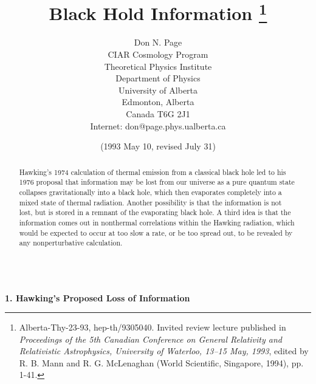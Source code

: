 \documentclass[12pt]{article}
\begin{document}
\title{Black Hold Information \thanks
{Alberta-Thy-23-93, hep-th/9305040.
Invited review lecture published in {\em Proceedings of the
5th Canadian Conference on General Relativity and Relativistic
Astrophysics,
University of Waterloo, 13--15 May, 1993}, edited by R. B. Mann and
R. G. McLenaghan (World Scientific, Singapore, 1994), pp. 1-41.}}
\author{ Don N. Page\\
CIAR Cosmology Program\\
Theoretical Physics Institute\\
Department of Physics\\University of Alberta\\
Edmonton, Alberta\\Canada T6G 2J1\\
Internet:  don@page.phys.ualberta.ca}
\date{(1993 May 10, revised July 31)}
\maketitle
\large
\begin{abstract}

     Hawking's 1974 calculation of thermal emission
from a classical black hole led to his 1976 proposal
that information may be lost from our universe as a
pure quantum state collapses gravitationally into a
black hole, which then evaporates completely into
a mixed state of thermal radiation.  Another possibility
is that the information is not lost, but is stored in a
remnant of the evaporating black hole.  A third idea
is that the information comes out in nonthermal
correlations within the Hawking radiation, which
would be expected to occur at too slow a rate,
or be too spread out, to be revealed by any
nonperturbative calculation.
\\
\\
\end{abstract}
\normalsize
\pagebreak

\vspace{5 mm}
{\bf 1.  Hawking's Proposed Loss of Information}
\vspace{5 mm}
\end{document}
